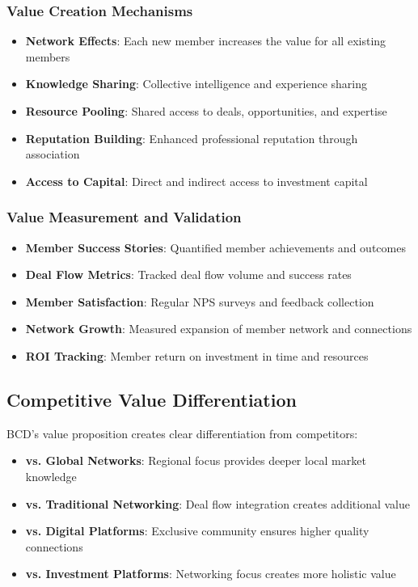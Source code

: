 \subsubsection{Value Creation Mechanisms}
\begin{itemize}
    \item \textbf{Network Effects}: Each new member increases the value for all existing members
    \item \textbf{Knowledge Sharing}: Collective intelligence and experience sharing
    \item \textbf{Resource Pooling}: Shared access to deals, opportunities, and expertise
    \item \textbf{Reputation Building}: Enhanced professional reputation through association
    \item \textbf{Access to Capital}: Direct and indirect access to investment capital
\end{itemize}

\subsubsection{Value Measurement and Validation}
\begin{itemize}
    \item \textbf{Member Success Stories}: Quantified member achievements and outcomes
    \item \textbf{Deal Flow Metrics}: Tracked deal flow volume and success rates
    \item \textbf{Member Satisfaction}: Regular NPS surveys and feedback collection
    \item \textbf{Network Growth}: Measured expansion of member network and connections
    \item \textbf{ROI Tracking}: Member return on investment in time and resources
\end{itemize}

\subsection{Competitive Value Differentiation}

BCD's value proposition creates clear differentiation from competitors:

\begin{itemize}
    \item \textbf{vs. Global Networks}: Regional focus provides deeper local market knowledge
    \item \textbf{vs. Traditional Networking}: Deal flow integration creates additional value
    \item \textbf{vs. Digital Platforms}: Exclusive community ensures higher quality connections
    \item \textbf{vs. Investment Platforms}: Networking focus creates more holistic value
\end{itemize}


